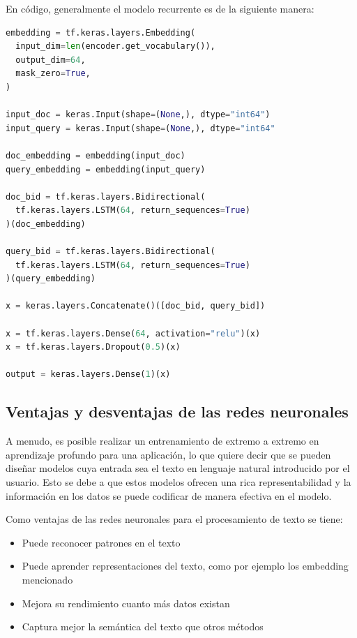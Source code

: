 \documentclass[12pt]{article}
\begin{document}
En c\'odigo, generalmente el modelo recurrente es de la siguiente manera:
\begin{lstlisting}[frame=single, breaklines, language=Python] 
embedding = tf.keras.layers.Embedding(
  input_dim=len(encoder.get_vocabulary()),
  output_dim=64,
  mask_zero=True,
) 

input_doc = keras.Input(shape=(None,), dtype="int64")
input_query = keras.Input(shape=(None,), dtype="int64"

doc_embedding = embedding(input_doc)
query_embedding = embedding(input_query)

doc_bid = tf.keras.layers.Bidirectional(
  tf.keras.layers.LSTM(64, return_sequences=True)
)(doc_embedding)

query_bid = tf.keras.layers.Bidirectional(
  tf.keras.layers.LSTM(64, return_sequences=True)
)(query_embedding)

x = keras.layers.Concatenate()([doc_bid, query_bid])

x = tf.keras.layers.Dense(64, activation="relu")(x)
x = tf.keras.layers.Dropout(0.5)(x)

output = keras.layers.Dense(1)(x)
\end{lstlisting}

\subsection{Ventajas y desventajas de las redes neuronales}
 
 A menudo, es posible realizar un entrenamiento de extremo a extremo en aprendizaje profundo para una aplicación, lo que quiere decir que se pueden dise\~nar modelos cuya entrada sea el texto en lenguaje natural introducido por el usuario. Esto se debe a que estos modelos ofrecen una rica representabilidad y la información en los datos se puede codificar de manera efectiva en el modelo.
 
 Como ventajas de las redes neuronales para el procesamiento de texto se tiene:
 \begin{itemize}
 	\item Puede reconocer patrones en el texto
 	\item Puede aprender representaciones del texto, como por ejemplo los embedding mencionado
 	\item Mejora su rendimiento cuanto m\'as datos existan
 	\item Captura mejor la sem\'antica del texto que otros m\'etodos
 \end{itemize}
\end{document}
